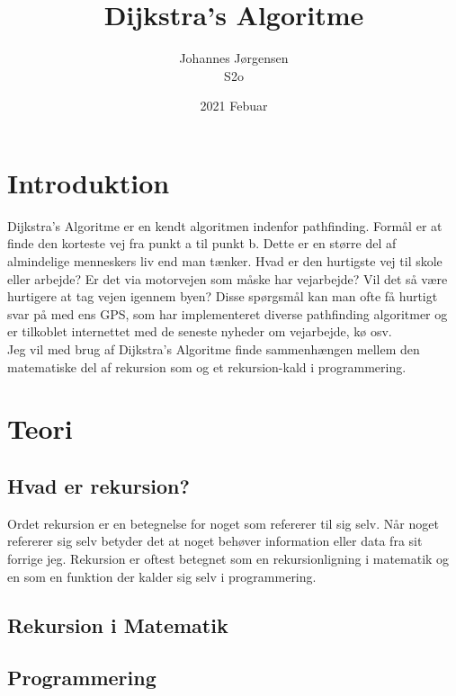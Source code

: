 \documentclass[12pt]{article}
\begin{document}
\title{Dijkstra's Algoritme}
\author{Johannes Jørgensen\\ S2o}
\date{2021 Febuar}
\maketitle
\pagebreak
\tableofcontents
\pagebreak

\section{Introduktion}
Dijkstra's Algoritme er en kendt algoritmen indenfor pathfinding. Formål er at finde den korteste vej fra punkt a til punkt b. Dette er en større del af almindelige menneskers liv end man tænker. Hvad er den hurtigste vej til skole eller arbejde? Er det via motorvejen som måske har vejarbejde? Vil det så være hurtigere at tag vejen igennem byen? Disse spørgsmål kan man ofte få hurtigt svar på med ens GPS, som har implementeret diverse pathfinding algoritmer og er tilkoblet internettet med de seneste nyheder om vejarbejde, kø osv. 
\\Jeg vil med brug af Dijkstra's Algoritme finde sammenhængen mellem den matematiske del af rekursion som og et rekursion-kald i programmering.  

\section{Teori}

\subsection{Hvad er rekursion?}
Ordet rekursion er en betegnelse for noget som refererer til sig selv. Når noget refererer sig selv betyder det at noget behøver information eller data fra sit forrige jeg. Rekursion er oftest betegnet som en rekursionligning i matematik og en som en funktion der kalder sig selv i programmering. 

\subsection{Rekursion i Matematik}

\subsection{Programmering}
\end{document}
